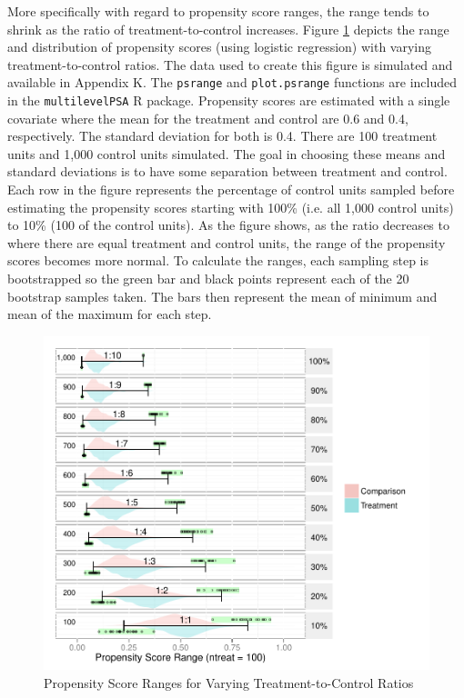 \documentclass[letterpaper,12p,twoside]{article} %
\begin{document}
More specifically with regard to propensity score ranges, the range tends to shrink as the ratio of treatment-to-control increases. Figure \ref{fig:psranges} depicts the range and distribution of propensity scores (using logistic regression) with varying treatment-to-control ratios. The data used to create this figure is simulated and available in Appendix K. The \texttt{psrange} and \texttt{plot.psrange} functions are included in the \texttt{multilevelPSA} R package. Propensity scores are estimated with a single covariate where the mean for the treatment and control are 0.6 and 0.4, respectively. The standard deviation for both is 0.4. There are 100 treatment units and 1,000 control units simulated. The goal in choosing these means and standard deviations is to have some separation between treatment and control. Each row in the figure represents the percentage of control units sampled before estimating the propensity scores starting with 100\% (i.e. all 1,000 control units) to 10\% (100 of the control units). As the figure shows, as the ratio decreases to where there are equal treatment and control units, the range of the propensity scores becomes more normal. To calculate the ranges, each sampling step is bootstrapped so the green bar and black points represent each of the 20 bootstrap samples taken. The bars then represent the mean of minimum and mean of the maximum for each step.

\begin{figure}[t]
\begin{center}
\includegraphics[width=\textwidth]{../Figures2009/PSRanges.pdf}
\caption{Propensity Score Ranges for Varying Treatment-to-Control Ratios}
\label{fig:psranges}
\end{center}
\end{figure}
\end{document}
